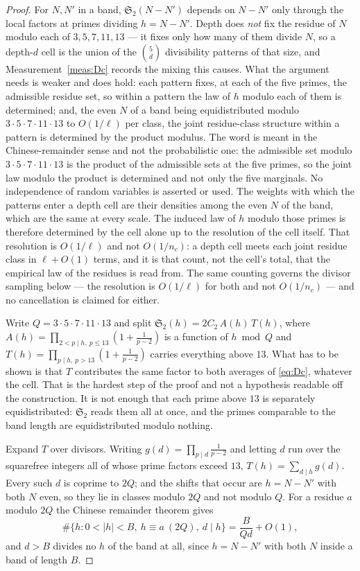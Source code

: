 \documentclass[11pt,a4paper]{article}
\theoremstyle{plain}
\theoremstyle{definition}
\theoremstyle{remark}
\renewcommand{\SS}{\mathfrak{S}}
\begin{document}
\begin{proof}
For $N,N'$ in a band, $\SS_2(N-N')$ depends on $N-N'$ only through the
local factors at primes dividing $h=N-N'$. Depth does \emph{not} fix
the residue of $N$ modulo each of $3,5,7,11,13$ --- it fixes only how
many of them divide $N$, so a depth-$d$ cell is the union of the
$\binom{5}{d}$ divisibility patterns of that size, and
Measurement~\ref{meas:Dc} records the mixing this causes. What the
argument needs is weaker and does hold: each pattern fixes, at each of
the five primes, the admissible residue set, so within a pattern the
law of $h$ modulo each of them is determined; and, the even $N$ of a
band being equidistributed modulo $3\cdot5\cdot7\cdot11\cdot13$ to
$O(1/\ell)$ per class, the joint residue-class structure within a
pattern is determined by the product modulus. The word is meant in the
Chinese-remainder sense and not the probabilistic one: the admissible
set modulo $3\cdot5\cdot7\cdot11\cdot13$ is the product of the
admissible sets at the five primes, so the joint law modulo the product
is determined and not only the five marginals. No independence of
random variables is asserted or used. The weights with
which the patterns enter a depth cell are their densities among the
even $N$ of the band, which are the same at every scale. The induced
law of $h$ modulo those primes is therefore determined by the cell
alone up to the resolution of the cell itself. That resolution is
$O(1/\ell)$ and not $O(1/n_c)$: a depth cell meets each joint residue
class in $\ell+O(1)$ terms, and it is that count, not the cell's
total, that the empirical law of the residues is read from. The same
counting governs the divisor sampling below --- the resolution is
$O(1/\ell)$ for both and not $O(1/n_c)$ --- and no cancellation is
claimed for either.

Write $Q=3\cdot5\cdot7\cdot11\cdot13$ and split
$\SS_2(h)=2C_2\,A(h)\,T(h)$, where
$A(h)=\prod_{2<p\mid h,\ p\le13}(1+\frac1{p-2})$ is a function of
$h\bmod Q$ and $T(h)=\prod_{p\mid h,\ p>13}(1+\frac1{p-2})$ carries
everything above $13$. What has to be shown is that $T$ contributes
the same factor to both averages of \eqref{eq:Dc}, whatever the cell.
That is the hardest step of the proof and not a hypothesis readable
off the construction. It is not enough that each prime above $13$ is
separately equidistributed: $\SS_2$ reads them all at once, and the
primes comparable to the band length are equidistributed modulo
nothing.

Expand $T$ over divisors. Writing $g(d)=\prod_{p\mid d}\frac1{p-2}$
and letting $d$ run over the squarefree integers all of whose prime
factors exceed $13$, $T(h)=\sum_{d\mid h}g(d)$. Every such $d$ is
coprime to $2Q$; and the shifts that occur are $h=N-N'$ with both $N$
even, so they lie in classes modulo $2Q$ and not modulo $Q$. For a
residue $a$ modulo $2Q$ the Chinese remainder theorem gives
\[
  \#\{h:0<|h|<B,\ h\equiv a\ (2Q),\ d\mid h\}
  =\frac{B}{Qd}+O(1),
\]
and $d>B$ divides no $h$ of the band at all, since $h=N-N'$ with both
$N$ inside a band of length $B$.


\end{proof}
\end{document}
